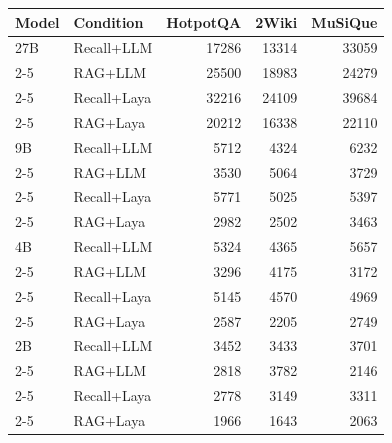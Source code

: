 \begin{tabular}{|l|l|r|r|r|}
\hline
Model & Condition & HotpotQA & 2Wiki & MuSiQue \\
\hline
27B & Recall+LLM & 17286 & 13314 & 33059 \\ %
\cline{2-5}
 & RAG+LLM & 25500 & 18983 & 24279 \\ %
\cline{2-5}
 & Recall+Laya & 32216 & 24109 & 39684 \\ %
\cline{2-5}
 & RAG+Laya & 20212 & 16338 & 22110 \\ %
\hline
9B & Recall+LLM & 5712 & 4324 & 6232 \\ %
\cline{2-5}
 & RAG+LLM & 3530 & 5064 & 3729 \\ %
\cline{2-5}
 & Recall+Laya & 5771 & 5025 & 5397 \\ %
\cline{2-5}
 & RAG+Laya & 2982 & 2502 & 3463 \\ %
\hline
4B & Recall+LLM & 5324 & 4365 & 5657 \\ %
\cline{2-5}
 & RAG+LLM & 3296 & 4175 & 3172 \\ %
\cline{2-5}
 & Recall+Laya & 5145 & 4570 & 4969 \\ %
\cline{2-5}
 & RAG+Laya & 2587 & 2205 & 2749 \\ %
\hline
2B & Recall+LLM & 3452 & 3433 & 3701 \\ %
\cline{2-5}
 & RAG+LLM & 2818 & 3782 & 2146 \\ %
\cline{2-5}
 & Recall+Laya & 2778 & 3149 & 3311 \\ %
\cline{2-5}
 & RAG+Laya & 1966 & 1643 & 2063 \\ %

\end{tabular}
